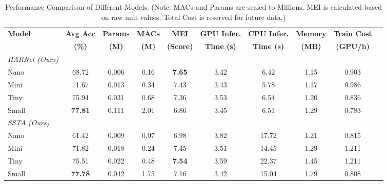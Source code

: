 \begin{table}[htbp]
    \centering
    \caption{Performance Comparison of Different Models. (Note: MACs and Params are scaled to Millions. MEI is calculated based on raw unit values. Total Cost is reserved for future data.)}
    \label{tab:model_comparison}
    \setlength{\tabcolsep}{5pt} %
    \renewcommand{\arraystretch}{1.2} %
    \begin{tabular}{lccccccccc} %
        \toprule
        \textbf{Model} & \textbf{Avg Acc} & \textbf{Params} & \textbf{MACs} & \textbf{MEI} & \textbf{GPU Infer.} & \textbf{CPU Infer.} & \textbf{Memory} & \textbf{Train Cost} \\
         & \textbf{(\%)} & \textbf{(M)} & \textbf{(M)} & \textbf{(Score)} & \textbf{Time (s)} & \textbf{Time (s)} & \textbf{(MB)} & \textbf{(GPU/h)} \\
        \midrule
        \textit{HARNet (Ours)} & & & & & & & & \\
        \quad Nano  & 68.72 & 0.006 & 0.16 & \textbf{7.65} & 3.42 & 6.42 & 1.15 & 0.903\\
        \quad Mini  & 71.67 & 0.013 & 0.34 & 7.43 & 3.43 & 5.78 & 1.17 & 0.986\\
        \quad Tiny  & 75.94 & 0.031 & 0.68 & 7.36 & 3.53 & 6.54 & 1.20 & 0.836\\
        \quad Small & \textbf{77.81} & 0.111 & 2.01 & 6.86 & 3.45 & 6.51 & 1.29 & 0.783\\
        \midrule
        \textit{SSTA (Ours)} & & & & & & & & \\
        \quad Nano  & 61.42 & 0.009 & 0.07 & 6.98 & 3.82 & 17.72 & 1.21 & 0.815\\
        \quad Mini  & 71.82 & 0.018 & 0.24 & 7.45 & 3.51 & 14.45 & 1.29 & 1.211\\
        \quad Tiny  & 75.51 & 0.022 & 0.48 & \textbf{7.54} & 3.59 & 22.37 & 1.45 & 1.211\\
        \quad Small & \textbf{77.78} & 0.042 & 1.75 & 7.16 & 3.42 & 15.04 & 1.79 & 0.808\\

\end{tabular}
\end{table}
